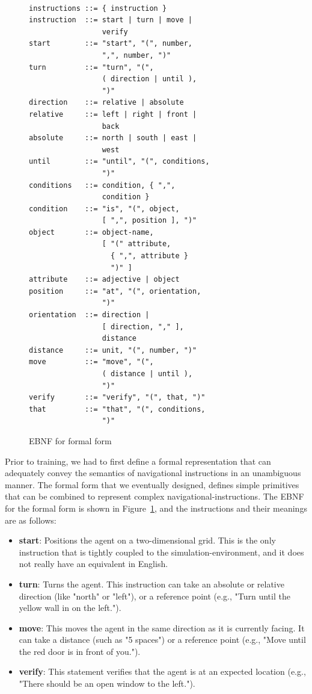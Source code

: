 \documentclass[11pt,letterpaper]{article}
\begin{document}
\begin{figure}[ht!]
\begin{Verbatim}[fontfamily=courier,fontsize=\footnotesize,fontseries=b]

instructions ::= { instruction }
instruction  ::= start | turn | move | 
                 verify
start        ::= "start", "(", number,
                 ",", number, ")"
turn         ::= "turn", "(", 
                 ( direction | until ), 
                 ")"
direction    ::= relative | absolute
relative     ::= left | right | front |
                 back
absolute     ::= north | south | east | 
                 west
until        ::= "until", "(", conditions, 
                 ")"
conditions   ::= condition, { ",", 
                 condition }
condition    ::= "is", "(", object, 
                 [ ",", position ], ")"
object       ::= object-name, 
                 [ "(" attribute, 
                   { ",", attribute } 
                   ")" ]                   
attribute    ::= adjective | object
position     ::= "at", "(", orientation, 
                 ")"
orientation  ::= direction | 
                 [ direction, "," ], 
                 distance
distance     ::= unit, "(", number, ")"
move         ::= "move", "(", 
                 ( distance | until ), 
                 ")"
verify       ::= "verify", "(", that, ")"
that         ::= "that", "(", conditions,
                 ")"
\end{Verbatim}
\caption{EBNF for formal form}\label{fig:ebnf}
\end{figure}

Prior to training, we had to first define a formal representation that can adequately convey the semantics of navigational instructions in an unambiguous manner. The formal form that we eventually designed, defines simple primitives that can be combined to represent complex navigational-instructions. The EBNF for the formal form is shown in Figure~\ref{fig:ebnf}, and the instructions and their meanings are as follows:
\begin{itemize}
    \item \textbf{start}: Positions the agent on a two-dimensional grid. This is the only instruction that is tightly coupled to the simulation-environment, and it does not really have an equivalent in English.
    \item \textbf{turn}: Turns the agent. This instruction can take an absolute or relative direction (like "north" or "left"), or a reference point (e.g., "Turn until the yellow wall in on the left.").
    \item \textbf{move}: This moves the agent in the same direction as it is currently facing. It can take a distance (such as "5 spaces") or a reference point (e.g., "Move until the red door is in front of you.").
    \item \textbf{verify}: This statement verifies that the agent is at an expected location (e.g., "There should be an open window to the left.").
\end{itemize}
\end{document}
